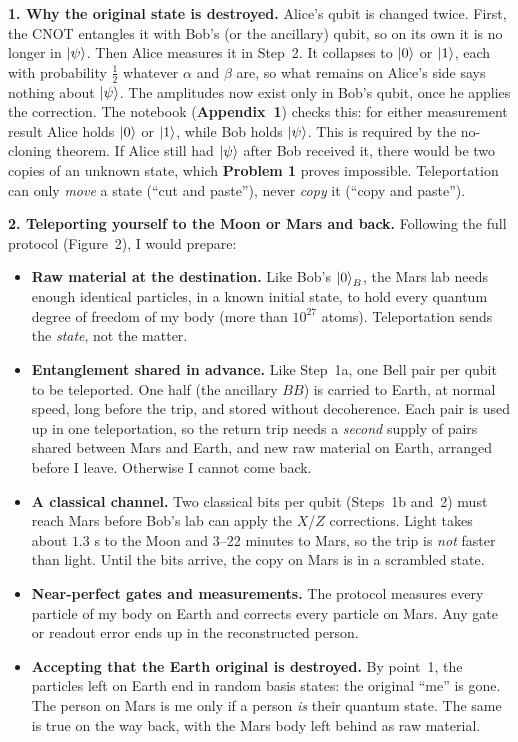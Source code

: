 \documentclass[a4paper, 10pt]{article}
\begin{document}
\begin{solution}
	\noindent \textbf{1. Why the original state is destroyed.} Alice's qubit is changed twice. First, the CNOT entangles it with Bob's (or the ancillary) qubit, so on its own it is no longer in \( \ket{\psi} \).
	Then Alice measures it in Step~2. It collapses to \( \ket{0} \) or \( \ket{1} \), each with probability \( \tfrac{1}{2} \) whatever \( \alpha \) and \( \beta \) are, so what remains on Alice's side says nothing about \( \ket{\psi} \).
	The amplitudes now exist only in Bob's qubit, once he applies the correction. The notebook (\textbf{Appendix~1}) checks this: for either measurement result Alice holds \( \ket{0} \) or \( \ket{1} \), while Bob holds \( \ket{\psi} \).
	This is required by the no-cloning theorem. If Alice still had \( \ket{\psi} \) after Bob received it, there would be two copies of an unknown state, which \textbf{Problem 1} proves impossible. Teleportation can only \emph{move} a state (``cut and paste''), never \emph{copy} it (``copy and paste'').

	\noindent \textbf{2. Teleporting yourself to the Moon or Mars and back.} Following the full protocol (Figure~2), I would prepare:
	\begin{itemize}
		\item \textbf{Raw material at the destination.} Like Bob's \( \ket{0}_B \), the Mars lab needs enough identical particles, in a known initial state, to hold every quantum degree of freedom of my body (more than \( 10^{27} \) atoms). Teleportation sends the \emph{state}, not the matter.
		\item \textbf{Entanglement shared in advance.} Like Step~1a, one Bell pair per qubit to be teleported. One half (the ancillary \( BB \)) is carried to Earth, at normal speed, long before the trip, and stored without decoherence. Each pair is used up in one teleportation, so the return trip needs a \emph{second} supply of pairs shared between Mars and Earth, and new raw material on Earth, arranged before I leave. Otherwise I cannot come back.
		\item \textbf{A classical channel.} Two classical bits per qubit (Steps~1b and~2) must reach Mars before Bob's lab can apply the \( X \)/\( Z \) corrections. Light takes about \( 1.3 \) s to the Moon and 3--22 minutes to Mars, so the trip is \emph{not} faster than light. Until the bits arrive, the copy on Mars is in a scrambled state.
		\item \textbf{Near-perfect gates and measurements.} The protocol measures every particle of my body on Earth and corrects every particle on Mars. Any gate or readout error ends up in the reconstructed person.
		\item \textbf{Accepting that the Earth original is destroyed.} By point~1, the particles left on Earth end in random basis states: the original ``me'' is gone. The person on Mars is me only if a person \emph{is} their quantum state. The same is true on the way back, with the Mars body left behind as raw material.
	\end{itemize}


\end{solution}
\end{document}
